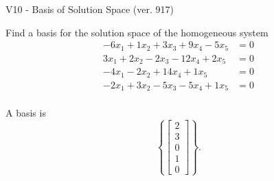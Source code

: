 \begin{exercise}
  \begin{exerciseTitle}V10 - Basis of Solution Space (ver. 917)\end{exerciseTitle}
  \begin{exerciseStatement}
    Find a basis for the solution space of the homogeneous system 
\begin{align*}
 -6 x_ 1 + 1 x_ 2 + 3 x_ 3 + 9 x_ 4 -5 x_ 5 &= 0  \\ 
  3 x_ 1 + 2 x_ 2 -2 x_ 3 -12 x_ 4 + 2 x_ 5 &= 0  \\ 
  -4 x_ 1 -2 x_ 2 + 14 x_ 4 + 1 x_ 5 &= 0  \\ 
  -2 x_ 1 + 3 x_ 2 -5 x_ 3 -5 x_ 4 + 1 x_ 5 &= 0  \\ 
 \end{align*}


 
  \end{exerciseStatement}

  \begin{exerciseAnswer}
   A basis is   
\[\left\{\left[\begin{array}{c}
2 \\
3 \\
0 \\
1 \\
0
\end{array}\right]\right\}.\]

  


  \end{exerciseAnswer}
\end{exercise}